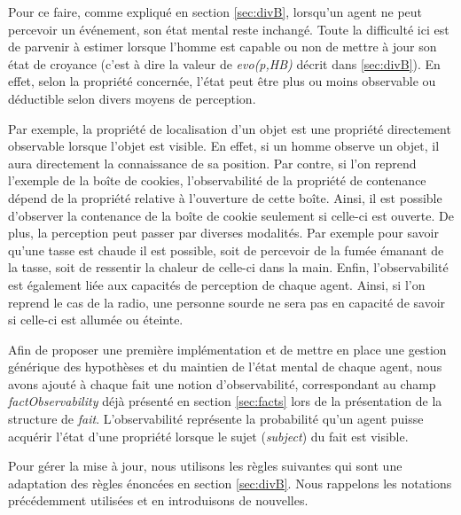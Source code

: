 \documentclass[a4paper,11pt,twoside]{StyleThese}
\begin{document}
Pour ce faire, comme expliqué en section \ref{sec:divB}, lorsqu'un agent ne peut percevoir un événement, son état mental reste inchangé.
Toute la difficulté ici est de parvenir à estimer lorsque l'homme est capable ou non de mettre à jour son état de croyance (c'est à dire la valeur de \textit{evo(p,HB)} décrit dans \ref{sec:divB}).
En effet, selon la propriété concernée, l'état peut être plus ou moins observable ou déductible selon divers moyens de perception.

Par exemple, la propriété de localisation d'un objet est une propriété directement observable lorsque l'objet est visible. En effet, si un homme observe un objet, il aura directement la connaissance de sa position. Par contre, si l'on reprend l'exemple de la boîte de cookies, l'observabilité de la propriété de contenance dépend de la propriété relative à l'ouverture de cette boîte. Ainsi, il est possible d'observer la contenance de la boîte de cookie seulement si celle-ci est ouverte.
De plus, la perception peut passer par diverses modalités. Par exemple pour savoir qu'une tasse est chaude il est possible, soit de percevoir de la fumée émanant de la tasse, soit de ressentir la chaleur de celle-ci dans la main.
Enfin, l'observabilité est également liée aux capacités de perception de chaque agent. Ainsi, si l'on reprend le cas de la radio, une personne sourde ne sera pas en capacité de savoir si celle-ci est allumée ou éteinte.

Afin de proposer une première implémentation et de mettre en place une gestion générique des hypothèses et du maintien de l'état mental de chaque agent, nous avons ajouté à chaque fait une notion d'observabilité, correspondant au champ \textit{factObservability} déjà présenté en section \ref{sec:facts} lors de la présentation de la structure de \textit{fait}.
L'observabilité représente la probabilité qu'un agent puisse acquérir l'état d'une propriété lorsque le sujet (\textit{subject}) du fait est visible.

Pour gérer la mise à jour, nous utilisons les règles suivantes qui sont une adaptation des règles énoncées en section \ref{sec:divB}. Nous rappelons les notations précédemment utilisées et en introduisons de nouvelles.
\end{document}
